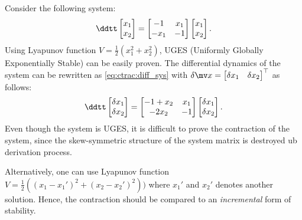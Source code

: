\begin{example}
    Consider the following system:
    \begin{equation}
        \ddtt
        \begin{bmatrix}
            x_1\\
            x_2
        \end{bmatrix}
        =
        \begin{bmatrix}
            -1 & x_1\\
            -x_1 & -1
        \end{bmatrix}
        \begin{bmatrix}
            x_1\\
            x_2
        \end{bmatrix}
        .
    \end{equation}
    Using Lyapunov function $V=\tfrac{1}{2}(x_1^2+x_2^2)$, UGES (Uniformly Globally Exponentially Stable) can be easily proven.
    The differential dynamics of the system can be rewritten as \eqref{eq:ctrac:diff_sys} with $\delta\bdx=\begin{bmatrix}\delta x_1 & \delta x_2\end{bmatrix}^\top$ as follows:
    \begin{equation}
        \ddtt
        \begin{bmatrix}
            \delta x_1\\
            \delta x_2
        \end{bmatrix}
        =
        \begin{bmatrix}
            -1+x_2 & x_1\\
            -2x_2 & -1
        \end{bmatrix}
        \begin{bmatrix}
            \delta x_1\\
            \delta x_2
        \end{bmatrix}
        .
    \end{equation}
    Even though the system is UGES, it is difficult to prove the contraction of the system, since the skew-symmetric structure of the system matrix is destroyed ub derivation process.

    Alternatively, one can use Lyapunov function $V=\tfrac{1}{2}((x_1-x_1')^2+(x_2-x_2')^2))$ where $x_1'$ and $x_2'$ denotes another solution.
    Hence, the contraction should be compared to an \textit{incremental} form of stability.
\end{example}

